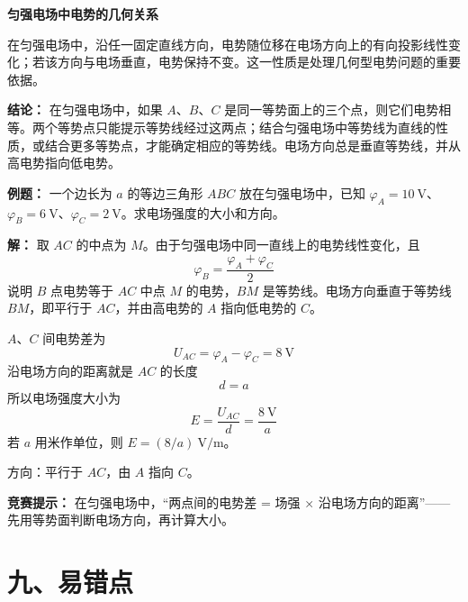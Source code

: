 \begin{competitionbox}
\textbf{匀强电场中电势的几何关系}

在匀强电场中，沿任一固定直线方向，电势随位移在电场方向上的有向投影线性变化；若该方向与电场垂直，电势保持不变。这一性质是处理几何型电势问题的重要依据。

\textbf{结论：} 在匀强电场中，如果 $A$、$B$、$C$ 是同一等势面上的三个点，则它们电势相等。两个等势点只能提示等势线经过这两点；结合匀强电场中等势线为直线的性质，或结合更多等势点，才能确定相应的等势线。电场方向总是垂直等势线，并从高电势指向低电势。

\textbf{例题：} 一个边长为 $a$ 的等边三角形 $ABC$ 放在匀强电场中，已知 $\varphi_A = 10\ \mathrm{V}$、$\varphi_B = 6\ \mathrm{V}$、$\varphi_C = 2\ \mathrm{V}$。求电场强度的大小和方向。

\begin{center}


\label{fig:uniform-field-triangle-potential}
\end{center}

\textbf{解：} 取 $AC$ 的中点为 $M$。由于匀强电场中同一直线上的电势线性变化，且
\[
\varphi_B=\frac{\varphi_A+\varphi_C}{2}
\]
说明 $B$ 点电势等于 $AC$ 中点 $M$ 的电势，$BM$ 是等势线。电场方向垂直于等势线 $BM$，即平行于 $AC$，并由高电势的 $A$ 指向低电势的 $C$。

$A$、$C$ 间电势差为
\[
U_{AC}=\varphi_A-\varphi_C=8\ \mathrm{V}
\]
沿电场方向的距离就是 $AC$ 的长度
\[
d=a
\]
所以电场强度大小为
\[
E=\frac{U_{AC}}{d}=\frac{8\ \mathrm V}{a}
\]
若 $a$ 用米作单位，则 $E=(8/a)\ \mathrm{V/m}$。

方向：平行于 $AC$，由 $A$ 指向 $C$。

\textbf{竞赛提示：} 在匀强电场中，“两点间的电势差 = 场强 × 沿电场方向的距离”——先用等势面判断电场方向，再计算大小。
\end{competitionbox}

\newpage
\section*{九、易错点}


